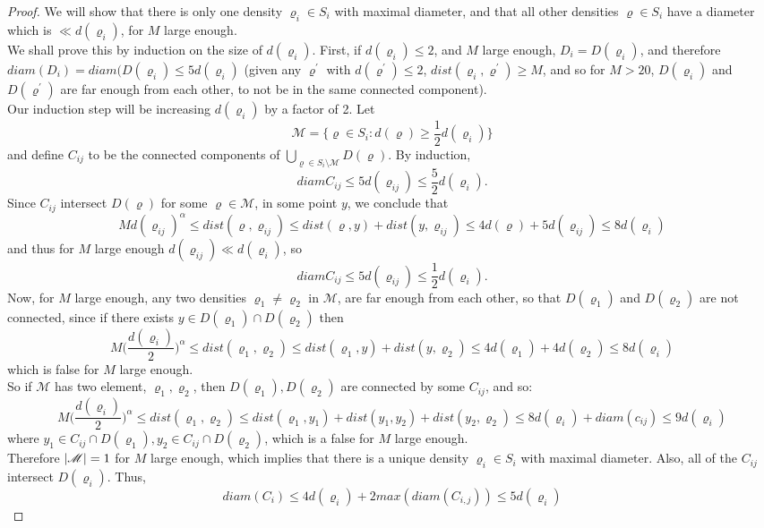 \documentclass[11pt,reqno]{article}
\DeclarePairedDelimiter\abs{\lvert}{\rvert}%
\theoremstyle{definition}
\begin{document}
\begin{proof}
We will show that there is only one density $\varrho_i \in S_i$ with maximal diameter, and that all other densities $\varrho \in S_i$ have a diameter which is $\ll d(\varrho_i)$, for $M$ large enough.\\
We shall prove this by induction on the size of $d(\varrho_i)$. First, if $d(\varrho_i) \leq 2$, and $M$ large enough, $D_i = D(\varrho_i)$, and therefore $diam(D_i) = diam(D(\varrho_i) \leq 5d(\varrho_i)$ (given any $\varrho^\prime$ with $d(\varrho^\prime) \leq 2$, $dist(\varrho_i,\varrho^\prime) \geq M$, and so for $M>20$, $D(\varrho_i)$ and $D(\varrho^\prime)$ are far enough from each other, to not be in the same connected component).\\
Our induction step will be increasing $d(\varrho_i)$ by a factor of 2. Let
$$
\mathscr{M} = \{ \varrho \in S_i: d(\varrho) \geq \frac{1}{2}d(\varrho_i) \}
$$
and define $C_{ij}$ to be the connected components of $ \bigcup_{\varrho \in S_i \setminus \mathscr{M}} D(\varrho)$. By induction, 
$$
diamC_{ij} \leq 5d(\varrho_{ij}) \leq \frac{5}{2} d(\varrho_i).
$$
Since $C_{ij}$ intersect $D(\varrho)$ for some $\varrho \in \mathscr{M}$, in some point $y$, we conclude that
$$
Md(\varrho_{ij})^\alpha \leq dist(\varrho, \varrho_{ij}) \leq 
dist(\varrho, y) + dist(y, \varrho_{ij}) \leq 4d(\varrho) + 5d(\varrho_{ij}) \leq 8d(\varrho_i)
$$
and thus for $M$ large enough $d(\varrho_{ij}) \ll d(\varrho_i)$, so
$$
diamC_{ij} \leq 5d(\varrho_{ij}) \leq \frac{1}{2} d(\varrho_i).
$$
Now, for $M$ large enough, any two densities $\varrho_1 \neq \varrho_2$ in $\mathscr{M}$, are far enough from each other, so that $D(\varrho_1)$ and $D(\varrho_2)$ are not connected, since if there exists $y \in D(\varrho_1)\cap D(\varrho_2)$ then
$$
M\Big( \frac{d(\varrho_i)}{2} \Big)^\alpha \leq dist(\varrho_1, \varrho_2) \leq dist(\varrho_1, y) + dist(y, \varrho_2) \leq 4d(\varrho_1) + 4d(\varrho_2) \leq 8d(\varrho_i)
$$
which is false for $M$ large enough.\\
So if $\mathscr{M}$ has two element, $\varrho_1, \varrho_2$, then $D(\varrho_1), D(\varrho_2)$ are connected by some $C_{ij}$, and so:
$$
M\Big( \frac{d(\varrho_i)}{2} \Big)^\alpha \leq dist(\varrho_1, \varrho_2) \leq dist(\varrho_1, y_1) + dist(y_1, y_2) + dist(y_2, \varrho_2) \leq 8d(\varrho_i) + diam(c_{ij}) \leq 9d(\varrho_i)
$$
where $y_1 \in C_{ij} \cap D(\varrho_1), y_2 \in C_{ij} \cap D(\varrho_2)$, which is a false for $M$ large enough.\\
Therefore $\abs{\mathscr{M}} = 1$ for $M$ large enough, which implies that there is a unique density $\varrho_i \in S_i$ with maximal diameter. Also, all of the $C_{ij}$ intersect $D(\varrho_i)$. Thus,
$$
diam(C_i) \leq 4d(\varrho_i) + 2max(diam(C_{i,j})) \leq 5d(\varrho_i)
$$
\end{proof}
\end{document}

